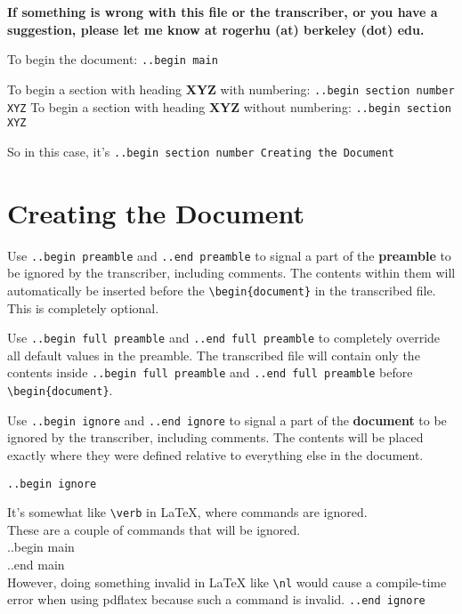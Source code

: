 \documentclass[12pt]{article}
\newcommand{\nl}{\\}
\renewcommand\bold{\textbf}
\numberwithin{equation}{section}
\begin{document}
\begin{flushleft}

\bold{If something is wrong with this file or the transcriber, or you have a suggestion, please let me know at rogerhu (at) berkeley (dot) edu.}

\bigskip

To begin the document: \verb|..begin main|

\bigskip

To begin a section with heading \bold{XYZ} with numbering: \verb|..begin section number XYZ|
To begin a section with heading \bold{XYZ} without numbering: \verb|..begin section XYZ|

So in this case, it's \verb|..begin section number Creating the Document|

\section{Creating the Document}

Use \verb|..begin preamble| and \verb|..end preamble| to signal a part of the \bold{preamble} to be ignored by the transcriber, including comments. The contents within them will automatically be inserted before the \verb|\begin{document}| in the transcribed file. This is completely optional.

\bigskip

Use \verb|..begin full preamble| and \verb|..end full preamble| to completely override all default values in the preamble. The transcribed file will contain only the contents inside \verb|..begin full preamble| and \verb|..end full preamble| before \verb|\begin{document}|.

\bigskip

Use \verb|..begin ignore| and \verb|..end ignore| to signal a part of the \bold{document} to be ignored by the transcriber, including comments. The contents will be placed exactly where they were defined relative to everything else in the document.

\verb|..begin ignore|

It's somewhat like \verb|\verb| in LaTeX, where commands are ignored. \\
These are a couple of commands that will be ignored. \\
..begin main \\
..end main \\
However, doing something invalid in LaTeX like \verb|\nl| would cause a compile-time error when using pdflatex because such a command is invalid. 
\verb|..end ignore|



\end{flushleft}
\end{document}
